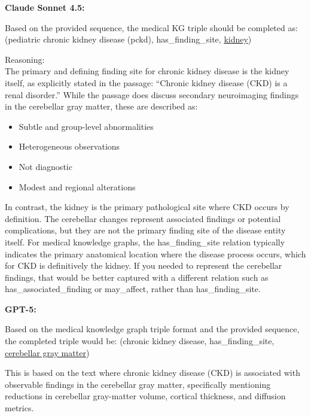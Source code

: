 \documentclass[10pt]{article}
\begin{document}
\begin{tcolorbox}[enhanced,breakable,colback=gray!5,colframe=gray!40,
                  left=6pt,right=6pt,top=6pt,bottom=6pt,boxsep=0pt]
\noindent\textbf{Claude Sonnet 4.5: }{\small
Based on the provided sequence, the medical KG triple should be completed as:\\
(pediatric chronic kidney disease (pckd), has\_finding\_site, \underline{kidney})

\vspace{\baselineskip}
Reasoning:\\
The primary and defining finding site for chronic kidney disease is the kidney itself, as explicitly stated in the passage: ``Chronic kidney disease (CKD) is a renal disorder.''
While the passage does discuss secondary neuroimaging findings in the cerebellar gray matter, these are described as:
\begin{itemize}
    \item Subtle and group-level abnormalities
    \item Heterogeneous observations
    \item Not diagnostic
    \item Modest and regional alterations
\end{itemize}
In contrast, the kidney is the primary pathological site where CKD occurs by definition. The cerebellar changes represent associated findings or potential complications, but they are not the primary finding site of the disease entity itself.
For medical knowledge graphs, the has\_finding\_site relation typically indicates the primary anatomical location where the disease process occurs, which for CKD is definitively the kidney.
If you needed to represent the cerebellar findings, that would be better captured with a different relation such as has\_associated\_finding or may\_affect, rather than has\_finding\_site.
}
\end{tcolorbox}


\begin{tcolorbox}[enhanced,breakable,colback=gray!5,colframe=gray!40,
                  left=6pt,right=6pt,top=6pt,bottom=6pt,boxsep=0pt]
\noindent\textbf{GPT-5: }{\small
Based on the medical knowledge graph triple format and the provided sequence, the completed triple would be:
(chronic kidney disease, has\_finding\_site, \underline{cerebellar gray matter})
\vspace{\baselineskip}

This is based on the text where chronic kidney disease (CKD) is associated with observable findings in the cerebellar gray matter, specifically mentioning reductions in cerebellar gray-matter volume, cortical thickness, and diffusion metrics.
}
\end{tcolorbox}
\end{document}
